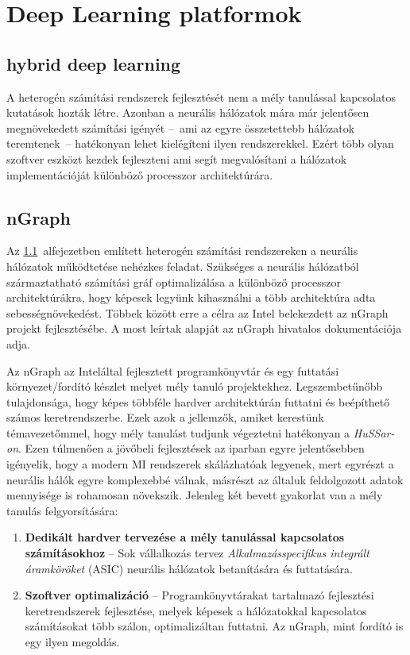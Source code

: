 \chapter{Deep Learning platformok}
\section{hybrid deep learning} \label{sect:hybridDL}
A heterogén számítási rendszerek fejlesztését nem a mély tanulással kapcsolatos kutatások hozták létre. Azonban a neurális hálózatok mára már jelentősen megnövekedett számítási igényét --~ami az egyre összetettebb hálózatok teremtenek~-- hatékonyan lehet kielégíteni ilyen rendszerekkel. Ezért több olyan szoftver eszközt kezdek fejleszteni ami segít megvalósítani a hálózatok implementációját különböző processzor architektúrára.

\section{nGraph}
Az \ref{sect:hybridDL}~alfejezetben említett heterogén számítási rendszereken a neurális hálózatok működtetése nehézkes feladat. Szükséges a neurális hálózatból származtatható számítási gráf optimalizálása a különböző processzor architektúrákra, hogy képesek legyünk kihasználni a több architektúra adta sebességnövekedést. Többek között erre a célra az Intel belekezdett az nGraph projekt fejlesztésébe. A most leírtak alapját az nGraph hivatalos dokumentációja adja\cite{web:ngraph_intro}.

Az nGraph az Intel\registeredlogo által fejlesztett programkönyvtár és egy futtatási környezet/fordító készlet melyet mély tanuló projektekhez.
Legszembetűnőbb tulajdonsága, hogy képes többféle hardver architektúrán futtatni és beépíthető számos keretrendszerbe.
Ezek azok a jellemzők, amiket kerestünk témavezetőmmel, hogy mély tanulást tudjunk végeztetni hatékonyan a \emph{HuSSar-on}. 
Ezen túlmenően a jövőbeli fejlesztések az iparban egyre jelentősebben igényelik, hogy a modern MI rendszerek skálázhatóak legyenek, mert egyrészt a neurális hálók egyre komplexebbé válnak, másrészt az általuk feldolgozott adatok mennyisége is rohamosan növekszik. Jelenleg két bevett gyakorlat van a mély tanulás felgyorsítására:
\begin{enumerate}[noitemsep]
	\item \textbf{Dedikált hardver tervezése a mély tanulással kapcsolatos számításokhoz} -- Sok vállalkozás tervez \emph{Alkalmazásspecifikus integrált áramköröket} (ASIC) neurális hálózatok betanítására és futtatására.
	\item \textbf{Szoftver optimalizáció} -- Programkönyvtárakat tartalmazó fejlesztési keretrendszerek fejlesztése, melyek képesek a hálózatokkal kapcsolatos számításokat több szálon, optimalizáltan futtatni. Az nGraph, mint fordító is egy ilyen megoldás.
\end{enumerate}

